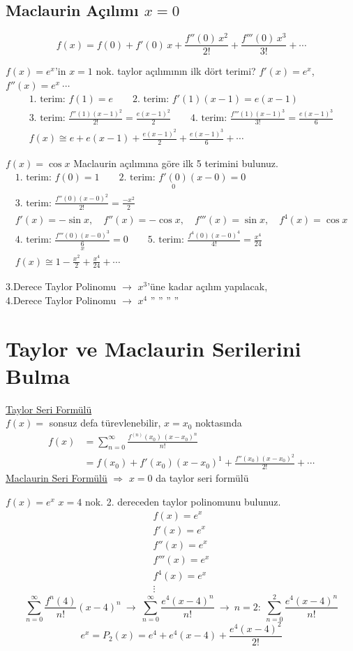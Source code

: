\documentclass[11pt,a4paper]{article}
\begin{document}
\subsection{Maclaurin Açılımı $x=0$}
\[ f(x)=f(0)+f'(0)\,x+\frac{f''(0)\,x^2}{2!}+\frac{f'''(0)\,x^3}{3!}+\cdots \]

$f(x)=e^x$'in $x=1$ nok. taylor açılımının ilk dört terimi? $f'(x)=e^x$, $f''(x)=e^x\ \cdots$
\begin{gather*}
\text{1. terim: }f(1)=e\qquad \text{2. terim: }f'(1)(x-1)=e(x-1)\\
\text{3. terim: }\frac{f''(1)(x-1)^2}{2!}=\frac{e(x-1)^2}{2}\qquad \text{4. terim: }\frac{f'''(1)(x-1)^3}{3!}=\frac{e(x-1)^3}{6}\\
f(x)\cong e+e(x-1)+\frac{e(x-1)^2}{2}+\frac{e(x-1)^3}{6}+\cdots
\end{gather*}

$f(x)=\cos x$ Maclaurin açılımına göre ilk 5 terimini bulunuz.
\begin{gather*}
\text{1. terim: }f(0)=1\qquad \text{2. terim: }\underset{0}{f'(0)}(x-0)=0\\
\text{3. terim: }\frac{f''(0)(x-0)^2}{2!}=\frac{-x^2}{2}\\
f'(x)=-\sin x,\quad f''(x)=-\cos x,\quad f'''(x)=\sin x,\quad f^{4}(x)=\cos x\\
\text{4. terim: }\frac{f'''(0)(x-0)^3}{\underset{3!}{6}}=0\qquad \text{5. terim: }\frac{f^{4}(0)(x-0)^4}{4!}=\frac{x^4}{24}\\
f(x)\cong1-\frac{x^2}{2}+\frac{x^4}{24}+\cdots
\end{gather*}

3.Derece Taylor Polinomu $\to$ $x^3$'üne kadar açılım yapılacak,\\
4.Derece Taylor Polinomu $\to$ $x^4$ '' '' '' ''

\section{Taylor ve Maclaurin Serilerini Bulma}
\underline{Taylor Seri Formülü}\\
$f(x)=$ sonsuz defa türevlenebilir, $x=x_0$ noktasında
\begin{align*}
f(x)&=\sum_{n=0}^{\infty}\frac{f^{(n)}(x_0)\,(x-x_0)^n}{n!}\\
&=f(x_0)+f'(x_0)(x-x_0)^1+\frac{f''(x_0)(x-x_0)^2}{2!}+\cdots
\end{align*}
\underline{Maclaurin Seri Formülü} $\Rightarrow$ $x=0$ da taylor seri formülü

$f(x)=e^x$ \quad $x=4$ nok. 2. dereceden taylor polinomunu bulunuz.
\[ \begin{array}{l}f(x)=e^x\\ f'(x)=e^x\\ f''(x)=e^x\\ f'''(x)=e^x\\ f^{4}(x)=e^x\\ \vdots\end{array} \]
\[ \sum_{n=0}^{\infty}\frac{f^{n}(4)}{n!}(x-4)^n\ \longrightarrow\ \sum_{n=0}^{\infty}\frac{e^4(x-4)^n}{n!}\ \to\ n=2:\ \sum_{n=0}^{2}\frac{e^4(x-4)^n}{n!} \]
\[ e^x=P_2(x)=e^4+e^4(x-4)+\frac{e^4(x-4)^2}{2!} \]
\end{document}
